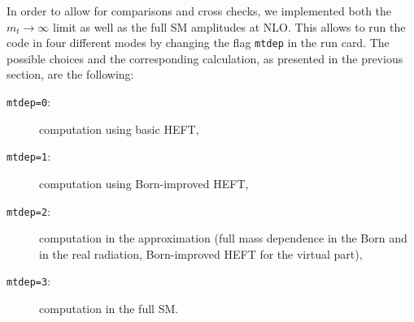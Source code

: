 In order to allow for comparisons and cross checks, we implemented
both the $m_t\to\infty$ limit as well as the full SM amplitudes at
NLO. This allows to run the code in four different modes by changing
the flag {\tt mtdep} in the \powhegbox{} run card. The possible
choices and the corresponding calculation, as presented in the
previous section, are the following:
\begin{description}
 \item[{\tt mtdep=0}:]{computation using basic HEFT,}
 \item[{\tt mtdep=1}:]{computation using Born-improved HEFT,}
 \item[{\tt mtdep=2}:]{computation in the approximation \ftapprox (full
   mass dependence in the Born and in the real radiation, Born-improved HEFT
   for the virtual part),}
 \item[{\tt mtdep=3}:]{computation in the full SM.}
\end{description}
